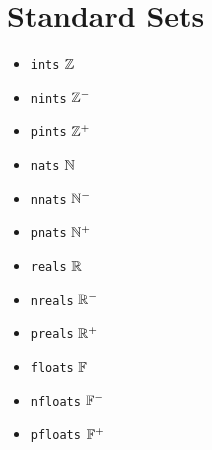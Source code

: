 \documentclass{article}
\begin{document}
\section{Standard Sets}
\begin{itemize}
  \item \verb!ints! $\mathbb{Z}$
  \item \verb!nints! $\mathbb{Z}^-$
  \item \verb!pints! $\mathbb{Z}^+$
  \item \verb!nats! $\mathbb{N}$
  \item \verb!nnats! $\mathbb{N}^-$
  \item \verb!pnats! $\mathbb{N}^+$
  \item \verb!reals! $\mathbb{R}$
  \item \verb!nreals! $\mathbb{R}^-$
  \item \verb!preals! $\mathbb{R}^+$
  \item \verb!floats! $\mathbb{F}$
  \item \verb!nfloats! $\mathbb{F}^-$
  \item \verb!pfloats! $\mathbb{F}^+$
\end{itemize}
\end{document}
